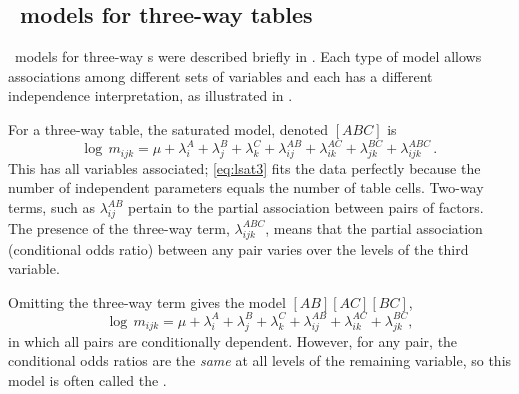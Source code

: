 \subsection{\Loglin\ models for three-way tables}
\Loglin\ models for three-way \ctab s
were described briefly in .
Each type of model allows associations among different sets of variables
and each has a different independence interpretation, as illustrated in
.

For a three-way table, the saturated model, denoted $[ABC]$ is
\begin{equation} \label{eq:lsat3}
  \log \,  m_{ijk}  =
  \mu  +  \lambda_i^A
  +  \lambda_j^B
  +  \lambda_k^C
  +  \lambda_{ij}^{AB}
  +  \lambda_{ik}^{AC}
  +  \lambda_{jk}^{BC}
  +  \lambda_{ijk}^{ABC}
  \period
\end{equation}
This has all variables associated; \eqref{eq:lsat3} fits the data perfectly because
the number of independent parameters equals the number of table cells.
Two-way terms, such as $\lambda_{ij}^{AB}$ pertain to the
partial association between pairs of factors.
The presence of the three-way term, $\lambda_{ijk}^{ABC}$,
means that the partial association (conditional odds ratio) between any pair
varies over the levels of the third variable.

Omitting the three-way term gives the model
$[AB] [AC] [BC]$,
\begin{equation} \label{eq:lno3way}
  \log \,  m_{ijk}  =
  \mu  +  \lambda_i^A
  +  \lambda_j^B
  +  \lambda_k^C
  +  \lambda_{ij}^{AB}
  +  \lambda_{ik}^{AC}
  +  \lambda_{jk}^{BC}
  \comma
\end{equation}
in which all pairs are conditionally dependent. However, for any pair,
the conditional odds ratios are the \emph{same} at all levels of the remaining
variable, so this model is often called the .

